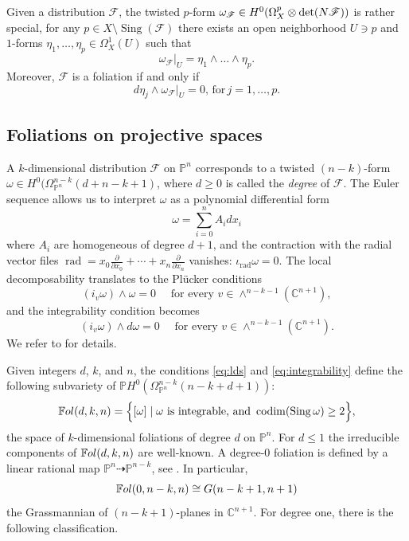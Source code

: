 \documentclass[twoside]{amsart}
\numberwithin{equation}{section}
\newcommand{\p}[1]{{\mathbb{P}^{#1}}}
\newcommand{\pn}{{\mathbb{P}^{n}}}
\DeclareMathOperator{\sing}{Sing}
\DeclareMathOperator{\codim}{codim}
\DeclareMathOperator{\rad}{rad}
\def\PP{{\mathbb{P}}}
\def\CC{{\mathbb{C}}}
\newcommand{\sF}{\mathscr{F}}
\newcommand{\nF}{{\rm N}\sF}
\newcommand{\Fol}{\mathbb{F}{\rm ol}}
\newcommand{\del}[1]{\frac{\partial}{\partial #1}}
\theoremstyle{definition}
\begin{document}
Given a distribution $\sF$, the twisted $p$-form $\omega_\sF\in H^0(\Omega_X^p\otimes \det(\nF))$ is rather special, for any $p \in X \setminus \sing(\sF)$ there exists an open neighborhood $U\ni p$ and $1$-forms $\eta_1, \dots, \eta_p \in \Omega_X^1(U)$ such that 
\[
\omega_\sF|_U = \eta_1\wedge \dots \wedge \eta_p.
\]
Moreover, $\sF$ is a foliation if and only if
\[
d\eta_j \wedge \omega_\sF|_U = 0, \, \text{for} \, j= 1, \dots, p.
\]

\subsection{Foliations on projective spaces}\label{sect:folsonPn}
A $k$-dimensional distribution $\sF$ on $\pn$ corresponds to a twisted $(n-k)$-form $\omega \in H^0(\Omega_{\pn}^{n-k}(d+n-k+1)$, where $d\geq 0$ is called the \emph{degree} of $\sF$. The Euler sequence allows us to interpret $\omega$ as a polynomial differential form
\[
\omega = \sum_{i=0}^n A_idx_i
\]
where $A_i$ are homogeneous of degree $d+1$, and the contraction with the radial vector files $\rad = x_0\del{ x_0} + \cdots + x_n\del{ x_n}$ vanishes: $\iota_{\rad} \omega = 0$. The local decomposability translates to the Pl\"{u}cker conditions  
\begin{equation}\label{eq:lds}
    ( {i}_v\omega) \wedge \omega = 0 \quad \text{ for every }v
 \in \wedge^{n-k-1}(\mathbb C^{n+1}) ,
\end{equation}
and the integrability condition becomes
\begin{equation}\label{eq:integrability}
     ( {i}_v\omega) \wedge d\omega = 0 \quad \text{ for every }v
 \in \wedge^{n-k-1}(\mathbb C^{n+1}) .
\end{equation}
We refer to \cite{Jou, CPV1} for details. 

Given integers $d$, $k$, and $n$, the conditions \eqref{eq:lds} and \eqref{eq:integrability} define the following subvariety of $\PP H^0(\Omega_{\pn}^{n-k}(n-k+d+1))$:
\begin{equation}\label{eq:def-Fol}
    \Fol(d,k,n) =  \Big\{[\omega]   \mid \omega \text{ is integrable, and } \codim( \sing \omega) \geq 2 \Big\},
\end{equation}
the space of $k$-dimensional foliations of degree $d$ on $\pn$. For $d \leq 1$ the irreducible components of $\Fol(d,k,n)$ are well-known. A degree-$0$ foliation is defined by a linear rational map $\pn \dashrightarrow \p{n-k}$, see \cite[ Th\'eor\`eme 3.8]{CD2}. In particular,
\[
\Fol(0,n-k,n) \cong G(n-k+1, n+1)
\]
the Grassmannian of $(n-k+1)$-planes in $\CC^{n+1}$. For degree one, there is the following classification. 
\end{document}
